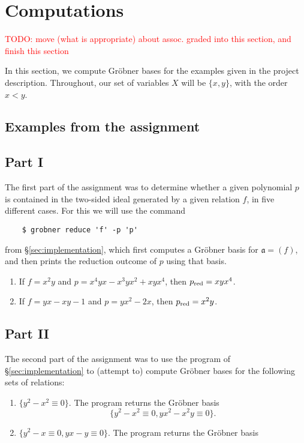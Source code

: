 \section{Computations}\label{sec:examples}
\textcolor{red}{TODO: move (what is appropriate) about assoc. graded into this section, and finish this section}

In this section, we compute Gr\"obner bases for the examples given in the project description. Throughout, our set of variables $X$ will be $\{x,y\}$, with the order $x < y$.

\subsection{Examples from the assignment}
\subsection*{Part I}

The first part of the assignment was to determine whether a given polynomial $p$ is contained in the two-sided ideal generated by a given relation $f$, in five different cases. For this we will use the command
\begin{verbatim}
	$ grobner reduce 'f' -p 'p'
\end{verbatim}
from \S\ref{sec:implementation}, which first computes a Gr\"obner basis for $\mathfrak{a} = (f)$, and then prints the reduction outcome of $p$ using that basis.

\begin{enumerate}
	\item If $f = x^2y$ and $p = x^4 y x - x^3 y x^2 + xyx^4$, then $p_{\mathrm{red}} = xyx^4$.
	\item If $f = yx - xy - 1$ and $ p = yx^2 - 2x$, then $p_{\mathrm{red}} = x^2 y$.
\end{enumerate}

\subsection*{Part II}

The second part of the assignment was to use the program of \S\ref{sec:implementation} to (attempt to) compute Gr\"obner bases for the following sets of relations:

\begin{enumerate}
	\item $\{y^2-x^2\equiv 0\}$. The program returns the Gr\"obner basis
	\begin{equation*}
		\{y^2-x^2\equiv 0,yx^2-x^2y\equiv 0\}.
	\end{equation*}
	\item $\{y^2-x\equiv 0,yx-y\equiv 0\}$. The program returns the Gr\"obner basis
\end{enumerate}

